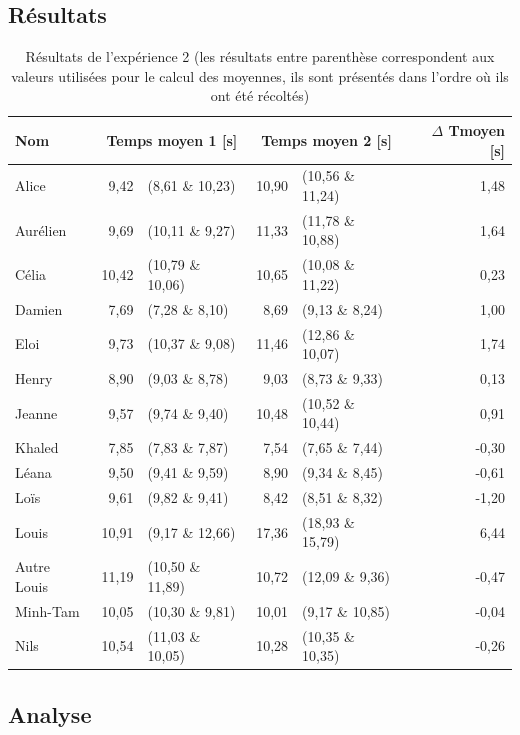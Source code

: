 \documentclass[12pt,fleqn,oneside,french,openany]{book} %
\begin{document}
\subsection{Résultats} \label{ssec:resultats2.2}

\begin{table}[h]
	\centering
	\caption{Résultats de l'expérience 2 (les résultats entre parenthèse correspondent aux valeurs utilisées pour le calcul des moyennes, ils sont présentés dans l'ordre où ils ont été récoltés)} \label{tbl:exp2.2}
	\begin{tabular}{lrlrlr}
		\toprule
		\textbf{Nom} &  \multicolumn{2}{c}{\textbf{Temps moyen 1 [s]}}  & \multicolumn{2}{c}{\textbf{Temps moyen 2 [s]}} & \textbf{$\Delta$ Tmoyen [s]} \\ \midrule
		Alice & 9,42 & (8,61 \& 10,23) & 10,90 & (10,56 \& 11,24) & 1,48 \\
		Aurélien & 9,69 & (10,11 \& 9,27) & 11,33 & (11,78 \& 10,88) & 1,64 \\
		Célia & 10,42 & (10,79 \& 10,06) & 10,65 & (10,08 \& 11,22) & 0,23 \\
		Damien & 7,69 & (7,28 \& 8,10) & 8,69 & (9,13 \& 8,24) & 1,00 \\
		Eloi & 9,73 & (10,37 \& 9,08) & 11,46 & (12,86 \& 10,07) & 1,74 \\
		Henry & 8,90 & (9,03 \& 8,78) & 9,03 & (8,73 \& 9,33) & 0,13 \\
		Jeanne & 9,57 & (9,74 \& 9,40) & 10,48 & (10,52 \& 10,44) & 0,91 \\
		Khaled & 7,85 & (7,83 \& 7,87) & 7,54 & (7,65 \& 7,44) & -0,30 \\
		Léana & 9,50 & (9,41 \& 9,59) & 8,90 & (9,34 \& 8,45) & -0,61 \\
		Loïs & 9,61 & (9,82 \& 9,41) & 8,42 & (8,51 \& 8,32) & -1,20 \\
		Louis & 10,91 & (9,17 \& 12,66) & 17,36 & (18,93 \& 15,79) & 6,44 \\
		Autre Louis & 11,19 & (10,50 \& 11,89) & 10,72 & (12,09 \& 9,36) & -0,47 \\
		Minh-Tam & 10,05 & (10,30 \& 9,81) & 10,01 & (9,17 \& 10,85) & -0,04 \\
		Nils & 10,54 & (11,03 \& 10,05) & 10,28 & (10,35 \& 10,35) & -0,26 \\ \bottomrule
	\end{tabular}
\end{table}

\subsection{Analyse} \label{ssec:analyse2.2}
\end{document}
